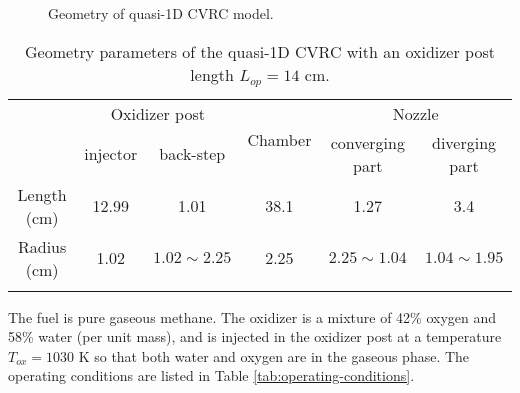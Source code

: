 \begin{figure}
\centering
{}
\caption{Geometry of quasi-1D CVRC model.}
\label{fig:radius}
\end{figure}

\begin{table} [h]
	\centering
	\caption{Geometry parameters of the quasi-1D CVRC with an oxidizer post length $L_{op}=14$ cm.}
	\centering
	\begin{tabular}{c c c c c c }
		\toprule
		\centering
		\multirow{2}{*}{Section} &
		\multicolumn{2}{c}{Oxidizer post} &
		\multirow{2}{*}{Chamber} &
		\multicolumn{2}{c}{Nozzle} \\
		\cmidrule(lr){2-3} \cmidrule(lr){5-6}
		& injector & back-step & & converging part & diverging part\\
		\midrule
		Length (cm) & 12.99 & 1.01 & 38.1 & 1.27 & 3.4 \\
		Radius (cm) & 1.02  & $1.02 \sim 2.25$ & 2.25 & $2.25 \sim 1.04$ & $1.04 \sim 1.95$ \\
		\bottomrule
		\label{tab:geometry_parameters}
	\end{tabular} 
\end{table}
The fuel is pure gaseous methane. The oxidizer is a mixture of 42\% oxygen and 58\% water (per unit mass), and is injected in the oxidizer post at a temperature $T_{ox}=1030$ K so that both water and oxygen are in the gaseous phase. The operating conditions are listed in Table \ref{tab:operating-conditions}.

